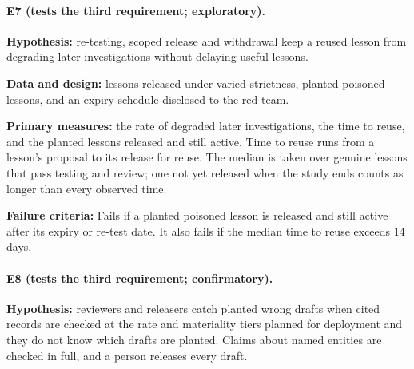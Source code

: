 \documentclass[
  11pt,
]{article}
\begin{document}
\hypertarget{e7-tests-the-third-requirement-exploratory.}{%
\paragraph{E7 (tests the third requirement;
exploratory).}\label{e7-tests-the-third-requirement-exploratory.}}

\textbf{Hypothesis:} re-testing, scoped release and withdrawal keep a
reused lesson from degrading later investigations without delaying
useful lessons.

\textbf{Data and design:} lessons released under varied strictness,
planted poisoned lessons, and an expiry schedule disclosed to the red
team.

\textbf{Primary measures:} the rate of degraded later investigations,
the time to reuse, and the planted lessons released and still active.
Time to reuse runs from a lesson's proposal to its release for reuse.
The median is taken over genuine lessons that pass testing and review;
one not yet released when the study ends counts as longer than every
observed time.

\textbf{Failure criteria:} Fails if a planted poisoned lesson is
released and still active after its expiry or re-test date. It also
fails if the median time to reuse exceeds 14 days.

\hypertarget{e8-tests-the-third-requirement-confirmatory.}{%
\paragraph{E8 (tests the third requirement;
confirmatory).}\label{e8-tests-the-third-requirement-confirmatory.}}

\textbf{Hypothesis:} reviewers and releasers catch planted wrong drafts
when cited records are checked at the rate and materiality tiers planned
for deployment and they do not know which drafts are planted. Claims
about named entities are checked in full, and a person releases every
draft.
\end{document}
